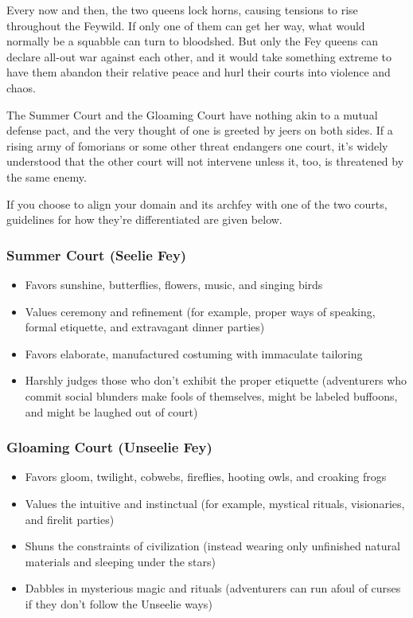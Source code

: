 \documentclass[10pt,a4paper,twoside,bg=print,twocolumn,openany,nodeprecatedcode]{dndbook}
\begin{document}
Every now and then, the two queens lock horns, causing tensions to rise throughout the Feywild. If only one of them can get her way, what would normally be a squabble can turn to bloodshed. But only the Fey queens can declare all-out war against each other, and it would take something extreme to have them abandon their relative peace and hurl their courts into violence and chaos.

The Summer Court and the Gloaming Court have nothing akin to a mutual defense pact, and the very thought of one is greeted by jeers on both sides. If a rising army of fomorians or some other threat endangers one court, it's widely understood that the other court will not intervene unless it, too, is threatened by the same enemy.

If you choose to align your domain and its archfey with one of the two courts, guidelines for how they're differentiated are given below.

\subsubsection{Summer Court (Seelie Fey)}

\begin{itemize}
\item Favors sunshine, butterflies, flowers, music, and singing birds
\item Values ceremony and refinement (for example, proper ways of speaking, formal etiquette, and extravagant dinner parties)
\item Favors elaborate, manufactured costuming with immaculate tailoring
\item Harshly judges those who don't exhibit the proper etiquette (adventurers who commit social blunders make fools of themselves, might be labeled buffoons, and might be laughed out of court)
\end{itemize}

\subsubsection{Gloaming Court (Unseelie Fey)}

\begin{itemize}
\item Favors gloom, twilight, cobwebs, fireflies, hooting owls, and croaking frogs
\item Values the intuitive and instinctual (for example, mystical rituals, visionaries, and firelit parties)
\item Shuns the constraints of civilization (instead wearing only unfinished natural materials and sleeping under the stars)
\item Dabbles in mysterious magic and rituals (adventurers can run afoul of curses if they don't follow the Unseelie ways)
\end{itemize}
\end{document}
